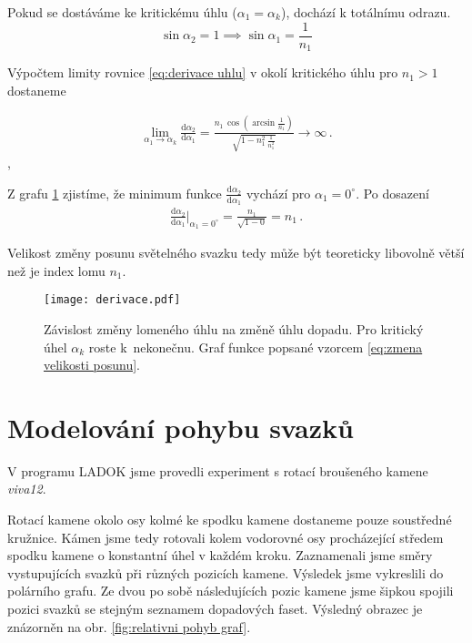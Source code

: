 Pokud se dostáváme ke kritickému úhlu ($\alpha_1 = \alpha_k$), dochází k totálnímu odrazu. 
\begin{equation}
 \sin\alpha_2 = 1 \implies \sin\alpha_1 = \frac{1}{n_1}
\end{equation}

Výpočtem limity rovnice \ref{eq:derivace uhlu} v okolí kritického úhlu pro $ n_1 > 1$ dostaneme 

\begin{eqnarray}
\lim_{\alpha_1 \to \alpha_k}\frac{\mathrm{d}\alpha_2}{\mathrm{d}\alpha_1} = \frac{n_1\,\cos(\arcsin\frac{1}{n_1})}{\sqrt{1-n_1^2\,\frac{1}{n_1^2}}} \to \infty\,.
\label{eq:zmena velikosti posunu}  
\end{eqnarray},

Z grafu \ref{fig:derivace uhlu} zjistíme, že minimum funkce $\frac{\mathrm{d}\alpha_2}{\mathrm{d}\alpha_1}$ vychází pro $ \alpha_1 = 0^\circ $. Po dosazení
\begin{eqnarray}
{\frac{\mathrm{d}\alpha_2}{\mathrm{d}\alpha_1}}\biggr\rvert_{\alpha_1 = 0^\circ}= \frac{n_1}{\sqrt{1-0}} = n_1\,.
\end{eqnarray}


Velikost změny posunu světelného svazku tedy může být teoreticky libovolně větší než je index lomu $n_1$. 

\begin{figure}[h!]
\begin{center}
\texttt{[image: derivace.pdf]}
\end{center}
\caption[Závislost změny lomeného úhlu na změně úhlu dopadu.]{Závislost změny lomeného úhlu na změně úhlu dopadu. Pro kritický úhel $\alpha_k$ roste k~nekonečnu. Graf funkce popsané vzorcem \ref{eq:zmena velikosti posunu}.}
\label{fig:derivace uhlu}
\end{figure}



\section{Modelování pohybu svazků}
V programu LADOK jsme provedli experiment s rotací broušeného kamene \textit{viva12}.

Rotací kamene okolo osy kolmé ke spodku kamene dostaneme pouze soustředné kružnice. Kámen jsme tedy rotovali kolem vodorovné osy procházející středem spodku kamene o konstantní úhel v každém kroku. Zaznamenali jsme směry vystupujících svazků při různých pozicích kamene. Výsledek jsme vykreslili do polárního grafu. Ze dvou po sobě následujících pozic kamene jsme šipkou spojili pozici svazků se stejným seznamem dopadových faset. Výsledný obrazec je znázorněn na obr. \ref{fig:relativni pohyb graf}.

